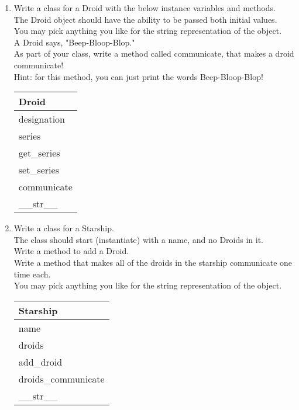 \pagebreak



	\item
	\begin{enumerate}
		\item
			Write a class for a Droid with the below instance variables and methods.\\ 
			The Droid object should have the ability to be passed both initial values.\\  
			You may pick anything you like for the string representation of the object.\\
			A Droid says, "Beep-Bloop-Blop."\\  
			As part of your class, write a method called communicate, that makes a droid communicate!\\
			Hint: for this method, you can just print the words Beep-Bloop-Blop!
			\begin{flushright}
			\begin{tabular}{|l|}
				\hline
				Droid\\ \hline
				designation\\	series\\	 \hline
				get\_series \\ set\_series \\ communicate \\ \_\_str\_\_ \\ \hline
			\end{tabular}
			\end{flushright}

		\item
			Write a class for a Starship. \\
			The class should start (instantiate) with a name, and no Droids in it. \\ 
			Write a method to add a Droid.\\
			Write a method that makes all of the droids in the starship communicate one time each.\\
			You may pick anything you like for the string representation of the object.
	
			\begin{flushright}
			\begin{tabular}{|l|}
				\hline
				Starship\\ \hline  	%
				name\\ droids\\ \hline		%
				add\_droid\\ droids\_communicate \\ \_\_str\_\_ \\ \hline		%
			\end{tabular}
			\end{flushright}


\end{enumerate}
